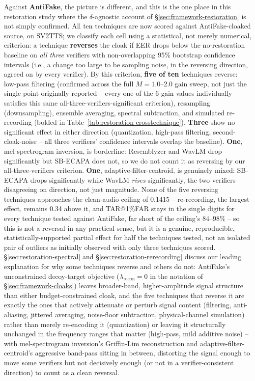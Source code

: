 \documentclass[11pt]{article}
\begin{document}
Against \textbf{AntiFake}, the picture is different, and this is the
one place in this restoration study where the $\delta$-agnostic
account of \S\ref{sec:framework-restoration} is not simply confirmed.
All ten techniques are now scored against AntiFake-cloaked source, on
SV2TTS; we classify each cell using a statistical, not merely
numerical, criterion: a technique \textbf{reverses} the cloak if EER
drops below the no-restoration baseline on \emph{all three} verifiers
with non-overlapping 95\% bootstrap confidence intervals (i.e., a
change too large to be sampling noise, in the reversing direction,
agreed on by every verifier). By this criterion, \textbf{five of ten}
techniques reverse: low-pass filtering (confirmed across the full
$M=1.0$--$2.0$ gain sweep, not just the single point originally
reported -- every one of the 6 gain values individually satisfies this
same all-three-verifiers-significant criterion), resampling
(downsampling), ensemble averaging, spectral subtraction, and simulated
re-recording (bolded in Table~\ref{tab:restoration-crosstechnique}).
\textbf{Three} show no
significant effect in either direction (quantization, high-pass
filtering, second-cloak-noise -- all three verifiers' confidence
intervals overlap the baseline). \textbf{One}, mel-spectrogram
inversion, is borderline: Resemblyzer and WavLM drop significantly but
SB-ECAPA does not, so we do not count it as reversing by our
all-three-verifiers criterion. \textbf{One}, adaptive-filter-centroid,
is genuinely mixed: SB-ECAPA drops significantly while WavLM
\emph{rises} significantly, the two verifiers disagreeing on direction,
not just magnitude. None of the five reversing techniques approaches
the clean-audio ceiling of 0.1415 -- re-recording, the largest effect,
remains 0.34 above it, and TAR@1\%FAR stays in the single digits for
every technique tested against AntiFake, far short of the ceiling's
84--98\% -- so this is not a reversal in any practical sense, but it is
a genuine, reproducible, statistically-supported partial effect for
half the techniques tested, not an isolated pair of outliers as
initially observed with only three techniques scored.
\S\ref{sec:restoration-spectral} and \S\ref{sec:restoration-rerecording}
discuss our leading explanation for why some techniques reverse and
others do not: AntiFake's unconstrained decoy-target objective
($\lambda_{\mathrm{recon}}=0$ in the notation of
\S\ref{sec:framework-cloaks}) leaves broader-band, higher-amplitude
signal structure than either budget-constrained cloak, and the five
techniques that reverse it are exactly the ones that actively attenuate
or perturb signal content (filtering, anti-aliasing, jittered
averaging, noise-floor subtraction, physical-channel simulation) rather
than merely re-encoding it (quantization) or leaving it structurally
unchanged in the frequency ranges that matter (high-pass, mild additive
noise) -- with mel-spectrogram inversion's Griffin-Lim reconstruction
and adaptive-filter-centroid's aggressive band-pass sitting in between,
distorting the signal enough to move some verifiers but not decisively
enough (or not in a verifier-consistent direction) to count as a clean
reversal.
\end{document}
